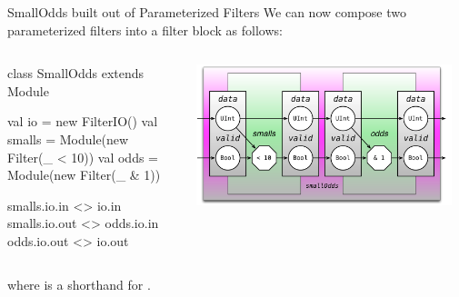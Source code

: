 \documentclass[xcolor=pdflatex,dvipsnames,table]{beamer}
\begin{document}
\begin{frame}[fragile]{SmallOdds built out of Parameterized Filters}
We can now compose two parameterized filters into a filter block as follows:

\begin{columns}

{
\begin{scala}
class SmallOdds extends Module { 
  val io     = new FilterIO()
  val smalls = Module(new Filter(_ < 10))
  val odds   = Module(new Filter(_ & 1))

  smalls.io.in  <> io.in
  smalls.io.out <> odds.io.in
  odds.io.out   <> io.out
}
\end{scala}
}


\begin{center}
\includegraphics[width=0.95\textwidth]{figs/small-odds.pdf} 
\end{center}

\end{columns}

\noindent
where  is a shorthand for .
\end{frame}
\end{document}
